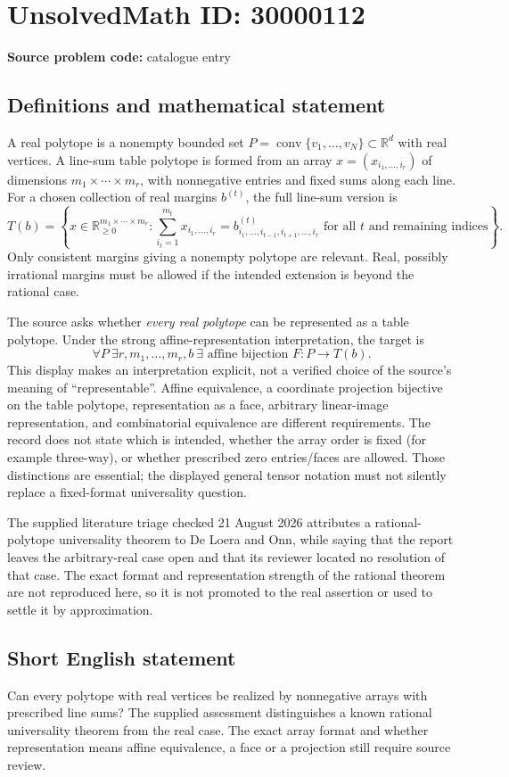 \documentclass[11pt]{article}
\newcommand{\R}{\mathbb{R}}
\begin{document}
\section*{UnsolvedMath ID: 30000112}
\textbf{Source problem code:} catalogue entry
\subsection{Definitions and mathematical statement}
A real polytope is a nonempty bounded set $P=\operatorname{conv}\{v_1,\ldots,v_N\}\subset\R^d$ with real vertices. A line-sum table polytope is formed from an array $x=(x_{i_1,\ldots,i_r})$ of dimensions $m_1\times\cdots\times m_r$, with nonnegative entries and fixed sums along each line. For a chosen collection of real margins $b^{(t)}$, the full line-sum version is
\[
 T(b)=\left\{x\in\R_{\geq0}^{m_1\times\cdots\times m_r}:
 \sum_{i_t=1}^{m_t}x_{i_1,\ldots,i_r}
 =b^{(t)}_{i_1,\ldots,i_{t-1},i_{t+1},\ldots,i_r}
 \text{ for all }t\text{ and remaining indices}\right\}.
\]
Only consistent margins giving a nonempty polytope are relevant. Real, possibly irrational margins must be allowed if the intended extension is beyond the rational case.

The source asks whether \emph{every real polytope} can be represented as a table polytope. Under the strong affine-representation interpretation, the target is
\[
 \forall P\ \exists r,m_1,\ldots,m_r,b\ \exists
 \text{ affine bijection }F:P\longrightarrow T(b).
\]
This display makes an interpretation explicit, not a verified choice of the source's meaning of ``representable''. Affine equivalence, a coordinate projection bijective on the table polytope, representation as a face, arbitrary linear-image representation, and combinatorial equivalence are different requirements. The record does not state which is intended, whether the array order is fixed (for example three-way), or whether prescribed zero entries/faces are allowed. Those distinctions are essential; the displayed general tensor notation must not silently replace a fixed-format universality question.

The supplied literature triage checked 21 August 2026 attributes a rational-polytope universality theorem to De Loera and Onn, while saying that the report leaves the arbitrary-real case open and that its reviewer located no resolution of that case. The exact format and representation strength of the rational theorem are not reproduced here, so it is not promoted to the real assertion or used to settle it by approximation.
\subsection{Short English statement}
Can every polytope with real vertices be realized by nonnegative arrays with prescribed line sums? The supplied assessment distinguishes a known rational universality theorem from the real case. The exact array format and whether representation means affine equivalence, a face or a projection still require source review.
\end{document}
